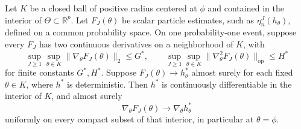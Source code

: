 \begin{thm}
\label{thm:consistent-derivatives}
Let $K$ be a closed ball of positive radius centered at $\phi$ and contained in the interior of $\Theta\subset\mathbb R^p$. Let $F_J(\theta)$ be scalar particle estimates, such as $\eta_n^J(h_\theta)$, defined on a common probability space. On one probability-one event, suppose every $F_J$ has two continuous derivatives on a neighborhood of $K$, with
\[
\sup_{J\geq1}\sup_{\theta\in K}\|\nabla_\theta F_J(\theta)\|_2\leq G^*,
\qquad
\sup_{J\geq1}\sup_{\theta\in K}\|\nabla_\theta^2 F_J(\theta)\|_{\mathrm{op}}\leq H^*
\]
for finite constants $G^*,H^*$. Suppose $F_J(\theta)\to h_\theta^*$ almost surely for each fixed $\theta\in K$, where $h^*$ is deterministic. Then $h^*$ is continuously differentiable in the interior of $K$, and almost surely
\[
\nabla_\theta F_J(\theta)\longrightarrow\nabla_\theta h_\theta^*
\]
uniformly on every compact subset of that interior, in particular at $\theta=\phi$.
\end{thm}
